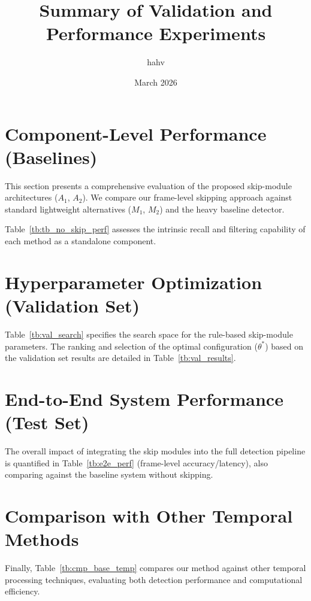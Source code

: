 \documentclass[10pt,a4paper]{article}
\begin{document}
\title{Summary of Validation and Performance Experiments}
\author{hahv}
\date{March 2026}
\maketitle


\section{Component-Level Performance (Baselines)}

\noindent This section presents a comprehensive evaluation of the proposed skip-module architectures ($A_1$, $A_2$). We compare our frame-level skipping approach against standard lightweight alternatives ($M_1$, $M_2$) and the heavy baseline detector.

\noindent Table~\ref{tb:tb_no_skip_perf} assesses the intrinsic recall and filtering capability of each method as a standalone component.


\section{Hyperparameter Optimization (Validation Set)}

\noindent Table~\ref{tb:val_search} specifies the search space for the rule-based skip-module parameters. The ranking and selection of the optimal configuration ($\theta^*$) based on the validation set results are detailed in Table~\ref{tb:val_results}.



\section{End-to-End System Performance (Test Set)}
\noindent The overall impact of integrating the skip modules into the full detection pipeline is quantified in Table~\ref{tb:e2e_perf} (frame-level accuracy/latency), also comparing against the baseline system without skipping.


\section{Comparison with Other Temporal Methods}

\noindent Finally, Table~\ref{tb:cmp_base_temp} compares our method against other temporal processing techniques, evaluating both detection performance and computational efficiency.


\end{document}
